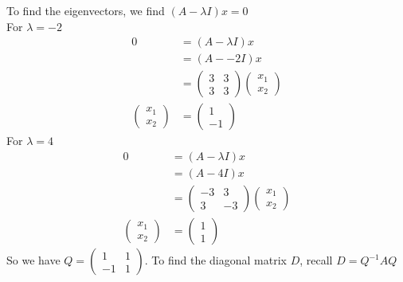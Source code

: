 \documentclass[13pt]{article}
\begin{document}
\begin{enumerate}[label=(\alph*),leftmargin=*]
\begin{enumerate}
  \end{enumerate}
  To find the eigenvectors, we find $(A - \lambda I)x = 0$ \\
  For $\lambda = -2$
  \begin{align*}
    0 &= (A - \lambda I)x \\
      &= (A - -2I)x \\
      &=
        \begin{pmatrix}
          3 & 3 \\
          3 & 3
        \end{pmatrix}
        \begin{pmatrix}
          x_1 \\
          x_2
        \end{pmatrix} \\
    \begin{pmatrix}
      x_1 \\
      x_2
    \end{pmatrix} &=
                    \begin{pmatrix}
                      1 \\
                      -1
                    \end{pmatrix}
  \end{align*}
  For $\lambda = 4$
  \begin{align*}
    0 &= (A - \lambda I)x \\
      &= (A - 4I)x \\
      &=
        \begin{pmatrix}
          -3 & 3 \\
          3 & -3
        \end{pmatrix}
        \begin{pmatrix}
          x_1 \\
          x_2
        \end{pmatrix} \\
    \begin{pmatrix}
      x_1 \\
      x_2
    \end{pmatrix} &=
                    \begin{pmatrix}
                      1 \\
                      1
                    \end{pmatrix}
  \end{align*}
  So we have $Q =
  \begin{pmatrix}
    1 & 1 \\
    -1 & 1
  \end{pmatrix}$. To find the diagonal matrix $D$, recall $D = Q^{-1}AQ$

\end{enumerate}
\end{document}
